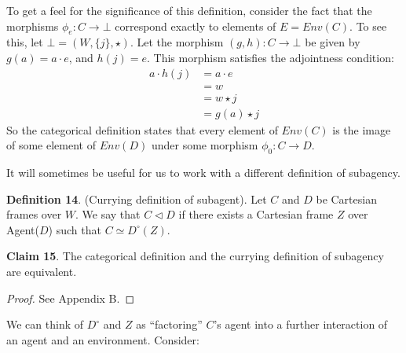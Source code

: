 \documentclass{article}
\begin{document}
\noindent To get a feel for the significance of this definition, consider the fact that the morphisms $\phi_e : C \to \bot$ correspond exactly to elements of $E = Env(C)$.
To see this, let $\bot = (W, \{j\}, \star)$.
Let the morphism $(g, h) : C \to \bot$ be given by $g(a) = a \cdot e$, and $h(j) = e$.
This morphism satisfies the adjointness condition:
\begin{displaymath}
\begin{split}
    a \cdot h(j) & = a \cdot e \\
                 & = w \\
                 & = w \star j \\
                 & = g(a) \star j
\end{split}
\end{displaymath}
So the categorical definition states that every element of $Env(C)$ is the image of some element of $Env(D)$ under some morphism $\phi_0 : C \to D$.

It will sometimes be useful for us to work with a different definition of subagency.

\bigskip 

\noindent \textbf{Definition 14}.
(Currying definition of subagent).
Let $C$ and $D$ be Cartesian frames over $W$.
We say that $C \triangleleft D$ if there exists a Cartesian frame $Z$ over Agent($D$) such that $C \simeq D^{\circ}(Z)$.
\bigskip

\noindent \textbf{Claim 15}.
The categorical definition and the currying definition of subagency are equivalent. 

\begin{proof}
See Appendix B.
\end{proof}

\bigskip
\noindent We can think of $D^{\circ}$ and $Z$ as ``factoring'' $C$'s agent into a further interaction of an agent and an environment.
Consider:
\end{document}
